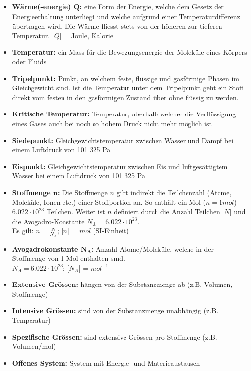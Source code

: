 		\begin{minipage}{18cm}
			\begin{itemize}
				\item \textbf{Wärme(-energie) $\boldsymbol{Q}$:} eine Form der Energie, welche dem Gesetz der Energieerhaltung unterliegt und welche aufgrund einer Temperaturdifferenz übertragen wird. Die Wärme fliesst stets von der höheren zur tieferen Temperatur. [$Q$] = Joule, Kalorie
				\item \textbf{Temperatur:} ein Mass für die Bewegungsenergie der Moleküle eines Körpers oder Fluids
				\item \textbf{Tripelpunkt:} Punkt, an welchem feste, flüssige und gasförmige Phasen im Gleichgewicht sind. Ist die Temperatur unter dem Tripelpunkt geht ein Stoff direkt vom festen in den gasförmigen Zustand über ohne flüssig zu werden. \label{Tripelpunkt}
				\item \textbf{Kritische Temperatur:} Temperatur, oberhalb welcher die Verflüssigung eines Gases auch bei noch so hohem Druck nicht mehr möglich ist \label{KritischTemperatur}
				\item \textbf{Siedepunkt:} Gleichgewichtstemperatur zwischen Wasser und Dampf bei einem Luftdruck von 101 325 Pa
				\item \textbf{Eispunkt:} Gleichgewichtstemperatur zwischen Eis und luftgesättigtem Wasser bei einem Luftdruck von 101 325 Pa
				\item \textbf{Stoffmenge $\boldsymbol{n}$:} Die Stoffmenge $n$ gibt indirekt die Teilchenzahl (Atome, Moleküle, Ionen etc.) einer Stoffportion an. So enthält ein Mol ($n=1mol$) $6.022 \cdot 10^{23}$ Teilchen. Weiter ist $n$ definiert durch die Anzahl Teilchen [$N$] und die Avogadro-Konstante $N_A = 6.022 \cdot 10^{23}$.\\
				Es gilt: $n = \frac{N}{N_A}$; [$n$] = $mol$ (SI-Einheit)
				\item \textbf{Avogadrokonstante $\boldsymbol{N_A}$:} Anzahl Atome/Moleküle, welche in der Stoffmenge von 1 Mol enthalten sind.\\
				$N_A = 6.022 \cdot 10^{23}$; [$N_A$] = $mol^{-1}$
				\item \textbf{Extensive Grössen:} hängen von der Substanzmenge ab (z.B. Volumen, Stoffmenge)
				\item \textbf{Intensive Grössen:} sind von der Substanzmenge unabhängig (z.B. Temperatur)
				\item \textbf{Spezifische Grössen:} sind extensive Grössen pro Stoffmenge (z.B. Volumen/mol)
				\item \textbf{Offenes System:} System mit Energie- und Materieaustausch

\end{itemize}
\end{minipage}
